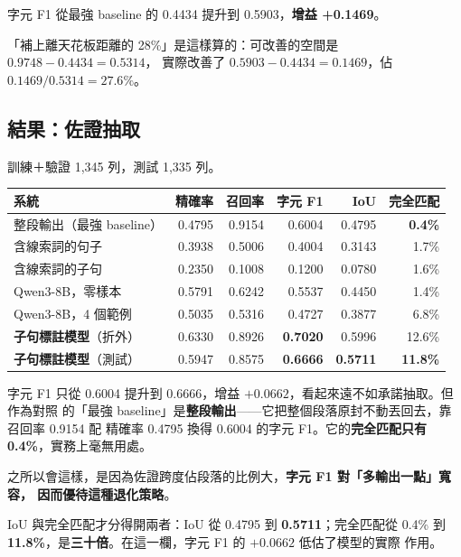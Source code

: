 \documentclass[11pt,a4paper]{ctexart}
\begin{document}
字元 F1 從最強 baseline 的 0.4434 提升到 0.5903，\textbf{增益 +0.1469}。

「補上離天花板距離的 28\%」是這樣算的：可改善的空間是 $0.9748 - 0.4434 = 0.5314$，
實際改善了 $0.5903 - 0.4434 = 0.1469$，佔 $0.1469 / 0.5314 = 27.6\%$。

\subsection{結果：佐證抽取}

訓練＋驗證 1{,}345 列，測試 1{,}335 列。

\begin{table}[h]
\centering\small
\begin{tabular}{@{}lrrrrr@{}}
\toprule
系統 & 精確率 & 召回率 & 字元 F1 & IoU & 完全匹配 \\
\midrule
\rowcolor{yellow!12}
整段輸出（最強 baseline） & 0.4795 & 0.9154 & 0.6004 & 0.4795 & \textbf{0.4\%} \\
含線索詞的句子 & 0.3938 & 0.5006 & 0.4004 & 0.3143 & 1.7\% \\
含線索詞的子句 & 0.2350 & 0.1008 & 0.1200 & 0.0780 & 1.6\% \\
\midrule
Qwen3-8B，零樣本 & 0.5791 & 0.6242 & 0.5537 & 0.4450 & 1.4\% \\
Qwen3-8B，4 個範例 & 0.5035 & 0.5316 & 0.4727 & 0.3877 & 6.8\% \\
\midrule
\rowcolor{green!12}
\textbf{子句標註模型}（折外） & 0.6330 & 0.8926 & \textbf{0.7020} & 0.5996 & 12.6\% \\
\rowcolor{green!12}
\textbf{子句標註模型}（測試） & 0.5947 & 0.8575 & \textbf{0.6666} & \textbf{0.5711} & \textbf{11.8\%} \\
\bottomrule
\end{tabular}
\end{table}

\begin{tcolorbox}[colback=yellow!8, colframe=orange!60, title=這一欄必須看對指標]
字元 F1 只從 0.6004 提升到 0.6666，增益 $+0.0662$，看起來遠不如承諾抽取。但作為對照
的「最強 baseline」是\textbf{整段輸出}——它把整個段落原封不動丟回去，靠召回率 0.9154 配
精確率 0.4795 換得 0.6004 的字元 F1。它的\textbf{完全匹配只有 0.4\%}，實務上毫無用處。

\medskip
之所以會這樣，是因為佐證跨度佔段落的比例大，\textbf{字元 F1 對「多輸出一點」寬容，
因而優待這種退化策略}。

\medskip
IoU 與完全匹配才分得開兩者：IoU 從 0.4795 到 \textbf{0.5711}；完全匹配從 0.4\% 到
\textbf{11.8\%}，是\textbf{三十倍}。在這一欄，字元 F1 的 $+0.0662$ 低估了模型的實際
作用。
\end{tcolorbox}
\end{document}
